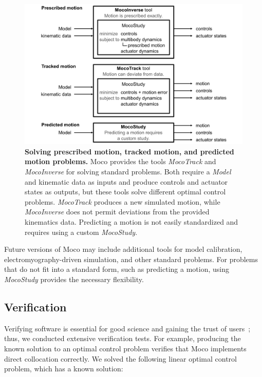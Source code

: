 \documentclass[10pt,letterpaper]{article}
\begin{document}
\begin{figure}[!h]
    \centering
    \includegraphics{../figures/MocoToolDiagram.png}
    \caption{{\bf Solving prescribed motion, tracked motion, and predicted motion problems.}
Moco provides the tools \textit{MocoTrack} and \textit{MocoInverse} for solving standard problems. Both require a \textit{Model} and kinematic data as inputs and produce controls and actuator states as outputs, but these tools solve different optimal control problems. \textit{MocoTrack} produces a new simulated motion, while \textit{MocoInverse} does not permit deviations from the provided kinematics data. Predicting a motion is not easily standardized and requires using a custom \textit{MocoStudy}.    }
    \label{mocotooldiagram}
\end{figure}

Future versions of Moco may include additional tools for model calibration, electromyography-driven simulation, and other standard problems. For problems that do not fit into a standard form, such as predicting a motion, using \textit{MocoStudy} provides the necessary flexibility.

\subsection*{Verification}

Verifying software is essential for good science and gaining the trust of users~\cite{Hicks:2015bo}; thus, we conducted extensive verification tests. For example, producing the known solution to an optimal control problem verifies that Moco implements direct collocation correctly. We solved the following linear optimal control problem, which has a known solution:
\end{document}
